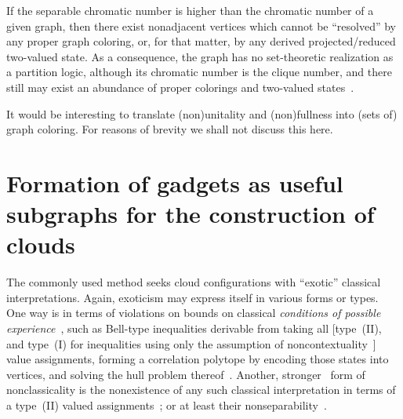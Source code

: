 \documentclass[%
  reprint,
  twocolumn,
 showpacs,
 showkeys,
 preprintnumbers,
 amsmath,amssymb,
 aps,
  prl,
  longbibliography,
 ]{revtex4-1}
\begin{document}
If the separable chromatic number is higher than the chromatic number of a given graph,
then there exist nonadjacent vertices which cannot be ``resolved''
by any proper graph coloring, or, for that matter, by any derived
projected/reduced two-valued state.
As a consequence, the graph has no set-theoretic realization as a partition logic,
although its chromatic number is the clique number,
and there still may exist an abundance of proper colorings and two-valued states~\cite[$\Gamma_3$, p.~70]{kochen1}.

It would be interesting to translate (non)unitality and (non)fullness into (sets of) graph coloring.
For reasons of brevity we shall not discuss this here.


\section{Formation of gadgets as useful subgraphs for the construction of clouds}

The commonly used method seeks cloud configurations with ``exotic'' classical interpretations.
Again, exoticism may express itself in various forms or types.
One way is in terms of violations on bounds on classical {\em conditions of possible experience}~\cite[p.~229]{Boole-62},
such as Bell-type inequalities derivable from taking all [type~(II),
and type~(I) for inequalities using only the assumption of noncontextuality~\cite{cabello:210401}] value assignments,
forming a correlation polytope by encoding those states into vertices, and solving the hull problem
thereof~\cite{froissart-81,cirelson,pitowsky-86,pitowsky,pitowsky-89a,Pit-91,Pit-94,2000-poly}.
Another, stronger~\cite{svozil-2011-enough} form of nonclassicality is the nonexistence
of any such classical interpretation in terms of a type~(II) valued
assignments~\cite{Gleason,specker-60,Zierler1975,kochen1,pitowsky:218};
or at least their nonseparability~\cite[Theorem~0, p.~67]{kochen1}.
\end{document}
